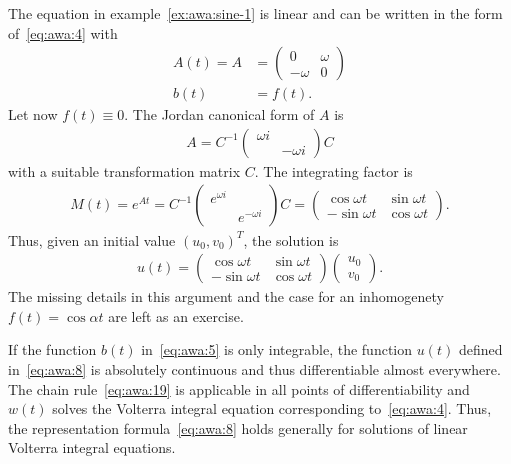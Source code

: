 \begin{example}
  \label{ex:awa:sine-2}
  The equation in example~\ref{ex:awa:sine-1} is linear and can be
  written in the form of~\eqref{eq:awa:4} with
  \begin{align*}
    A(t) = A &=
    \begin{pmatrix}
      0 & \omega \\ -\omega & 0
    \end{pmatrix}
    \\
    b(t) &= f(t).
  \end{align*}
  Let now $f(t) \equiv 0$. The Jordan canonical form of $A$ is
  \begin{gather*}
    A = C^{-1}
    \begin{pmatrix}
      \omega i \\ & -\omega i
    \end{pmatrix}
    C
  \end{gather*}
  with a suitable transformation matrix $C$. The integrating factor is
  \begin{gather*}
    M(t) = e^{At} = C^{-1}
    \begin{pmatrix}
      e^{\omega i} \\ & e^{-\omega i}
    \end{pmatrix} C
    =
    \begin{pmatrix}
      \cos \omega t & \sin \omega t \\
      -\sin \omega t & \cos \omega t
    \end{pmatrix}.
  \end{gather*}
  Thus, given an initial value $(u_0, v_0)^T$, the solution is
  \begin{gather*}
    u(t) =  \begin{pmatrix}
      \cos \omega t & \sin \omega t \\
      -\sin \omega t & \cos \omega t
    \end{pmatrix}
    \begin{pmatrix}
      u_0\\v_0
    \end{pmatrix}.
  \end{gather*}
  The missing details in this argument and the case for an
  inhomogenety $f(t) = \cos \alpha t$ are left as an exercise.
\end{example}

\begin{remark}
  If the function $b(t)$ in~\eqref{eq:awa:5} is only integrable, the
  function $u(t)$ defined in~\eqref{eq:awa:8} is absolutely continuous
  and thus differentiable almost everywhere. The chain
  rule~\eqref{eq:awa:19} is applicable in all points of
  differentiability and $w(t)$ solves the Volterra integral equation
  corresponding to~\eqref{eq:awa:4}. Thus, the representation
  formula~\eqref{eq:awa:8} holds generally for solutions of linear
  Volterra integral equations.
\end{remark}

